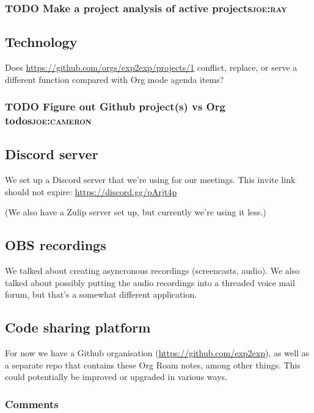 \documentclass[11pt]{article}
\begin{document}
\subsubsection{{\bfseries\sffamily TODO} Make a project analysis of active projects\hfill{}\textsc{joe:ray}}
\label{sec:org528baff}

\subsection{Technology}
\label{sec:org05b1fa6}

Does \url{https://github.com/orgs/exp2exp/projects/1} conflict, replace, or
serve a different function compared with Org mode agenda items?  

\subsubsection{{\bfseries\sffamily TODO} Figure out Github project(s) vs Org todos\hfill{}\textsc{joe:cameron}}
\label{sec:org53683ea}

\subsection{Discord server}
\label{sec:org8ebbd6c}
We set up a Discord server that we’re using for our meetings.  This
invite link should not expire: \url{https://discord.gg/pArjt4p}

(We also have a Zulip server set up, but currently we’re using it
less.)
\subsection{OBS recordings}
\label{sec:orgaa3b5ec}
We talked about creating asyncronous recordings (screencasts,
audio). We also talked about possibly putting the audio recordings
into a threaded voice mail forum, but that's a somewhat different
application.

\subsection{Code sharing platform}
\label{sec:orgd47c994}
For now we have a Github organisation (\url{https://github.com/exp2exp}), as
well as a separate repo that contains these Org Roam notes, among
other things.  This could potentially be improved or upgraded in
various ways.

\subsubsection{Comments}
\label{sec:orge6e9e87}
\end{document}
